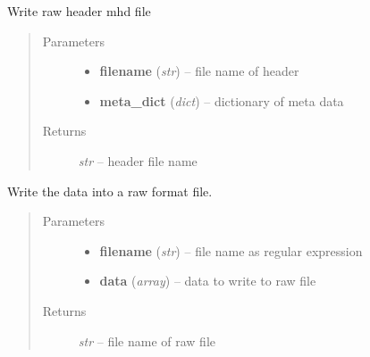\documentclass[letterpaper,10pt,english]{sphinxmanual}
\begin{document}

\begin{fulllineitems}
\label{api/ClearMap.IO:ClearMap.IO.RAW.writeHeader}
Write raw header mhd file
\begin{quote}\begin{description}
\item[{Parameters}] \leavevmode\begin{itemize}
\item {} 
\textbf{filename} (\emph{str}) --
file name of header

\item {} 
\textbf{meta\_dict} (\emph{dict}) --
dictionary of meta data

\end{itemize}

\item[{Returns}] \leavevmode
\emph{str} --
header file name

\end{description}\end{quote}

\end{fulllineitems}


\begin{fulllineitems}
\label{api/ClearMap.IO:ClearMap.IO.RAW.writeRawData}
Write the data into a raw format file.
\begin{quote}\begin{description}
\item[{Parameters}] \leavevmode\begin{itemize}
\item {} 
\textbf{filename} (\emph{str}) --
file name as regular expression

\item {} 
\textbf{data} (\emph{array}) --
data to write to raw file

\end{itemize}

\item[{Returns}] \leavevmode
\emph{str} --
file name of raw file

\end{description}\end{quote}

\end{fulllineitems}
\end{document}
